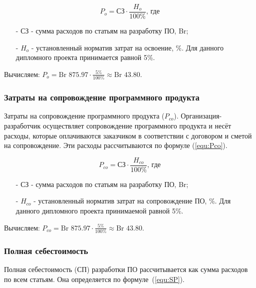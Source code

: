 \begin{equation}
    \label{equ:Po}
    P_o = \text{СЗ} \cdot \frac{ H_o }{ 100\% } \text{, где}
\end{equation}

\begin{enumerate}
    \item[-] $\text{СЗ}$ - сумма расходов по статьям на разработку ПО, Br; 
    \item[-] $H_o$ - установленный норматив затрат на освоение, \%. Для данного дипломного проекта принимается равной 5\%.
\end{enumerate}

Вычисляем: $P_o = \text{Br }875.97 \cdot \frac{ 5\% }{ 100\% } \approx \text{Br } 43.80$.

\subsubsection*{Затраты на сопровождение программного продукта}

Затраты на сопровождение программного продукта ($P_{co}$).
Организация-разработчик осуществляет сопровождение программного продукта и несёт расходы,
которые оплачиваются заказчиком в соответствии с договором и сметой на сопровождение.
Эти расходы рассчитываются по формуле (\ref{equ:Pco}).

\begin{equation}
    \label{equ:Pco}
    P_{co} = \text{СЗ} \cdot \frac{ H_{co} }{ 100\% } \text{, где}
\end{equation}

\begin{enumerate}
    \item[-] $\text{СЗ}$ - сумма расходов по статьям на разработку ПО, Br; 
    \item[-] $H_{co}$ - установленный норматив затрат на сопровождение ПО, \%. Для данного дипломного проекта принимаемой равной 5\%. 
\end{enumerate}

Вычисляем: $P_{co} = \text{Br }875.97 \cdot \frac{ 5\% }{ 100\% } \approx \text{Br } 43.80$.

\subsubsection*{Полная себестоимость}

Полная себестоимость ($\text{СП}$) разработки ПО рассчитывается как сумма расходов по всем статьям.
Она определяется по формуле~(\ref{equ:SP}). 

